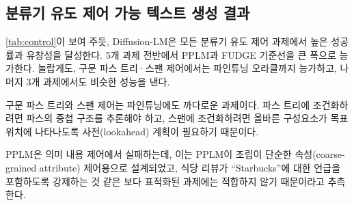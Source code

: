 \documentclass{article}
\begin{document}
\subsection{분류기 유도 제어 가능 텍스트 생성 결과}
\label{ssec:control}
\begin{table}
\centering
{}
\caption{\label{tab:control} Diffusion-LM은 5개 제어 과제 전반에서 높은 성공률(\success)과 좋은 유창성(\fluency)을 달성하여 PPLM·FUDGE 기준선을 능가한다. 본 방법은 구문 파스 트리·스팬 제어에서는 파인튜닝 오라클(FT)보다도 더 좋다.}
\end{table}
\cref{tab:control}이 보여 주듯, Diffusion-LM은 모든 분류기 유도 제어 과제에서 높은 성공률과 유창성을 달성한다. 5개 과제 전반에서 PPLM과 FUDGE 기준선을 큰 폭으로 능가한다. 놀랍게도, 구문 파스 트리·스팬 제어에서는 파인튜닝 오라클까지 능가하고, 나머지 3개 과제에서도 비슷한 성능을 낸다.

구문 파스 트리와 스팬 제어는 파인튜닝에도 까다로운 과제이다. 파스 트리에 조건화하려면 파스의 중첩 구조를 추론해야 하고, 스팬에 조건화하려면 올바른 구성요소가 목표 위치에 나타나도록 사전(lookahead) 계획이 필요하기 때문이다.

PPLM은 의미 내용 제어에서 실패하는데, 이는 PPLM이 조립이 단순한 속성(coarse-grained attribute) 제어용으로 설계되었고, 식당 리뷰가 ``Starbucks''에 대한 언급을 포함하도록 강제하는 것 같은 보다 표적화된 과제에는 적합하지 않기 때문이라고 추측한다.
\end{document}
